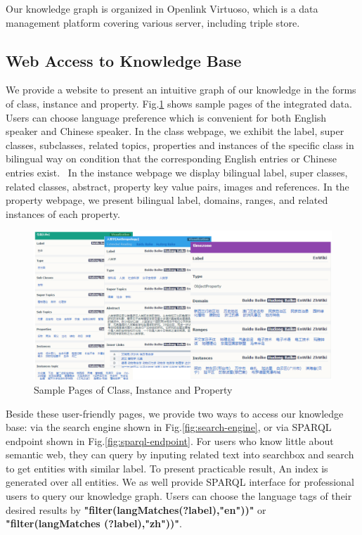 \documentclass[runningheads,a4paper]{llncs}
\begin{document}
Our knowledge graph is organized in Openlink Virtuoso, which is a data management platform covering various server, including triple store. 

\subsection{Web Access to Knowledge Base}
We provide a website to present an intuitive graph of our knowledge in the forms of class, instance and property. Fig.\ref{fig:xlore} shows sample pages of the integrated data. Users can choose language preference which is convenient for both English speaker and Chinese speaker. In the class webpage, we exhibit the label, super classes, subclasses, related topics, properties and instances of the specific class in bilingual way on condition that the corresponding English entries or Chinese entries exist.  In the instance webpage we display bilingual label, super classes, related classes, abstract, property key value pairs, images and references. In the property webpage, we present bilingual label, domains, ranges, and related instances of each property. 
\begin{figure}[ht]
    \centerline{\includegraphics[width=1\columnwidth]{fig/xlore}}
    \caption{Sample Pages of Class, Instance and Property}
    \label{fig:xlore}
\end{figure}%
Beside these user-friendly pages, we provide two ways to access our knowledge base: via the search engine shown in Fig.\ref{fig:search-engine}, or via SPARQL endpoint shown in Fig.\ref{fig:sparql-endpoint}. For users who know little about semantic web, they can query by inputing related text into searchbox and search to get entities with similar label. To present practicable result, An index is generated over all entities. We as well provide SPARQL interface for professional users to query our knowledge graph. Users can choose the language tags of their desired results by \textbf{"filter(langMatches(?label),"en"))"} or \textbf{"filter(langMatches (?label),"zh"))"}.
\end{document}
